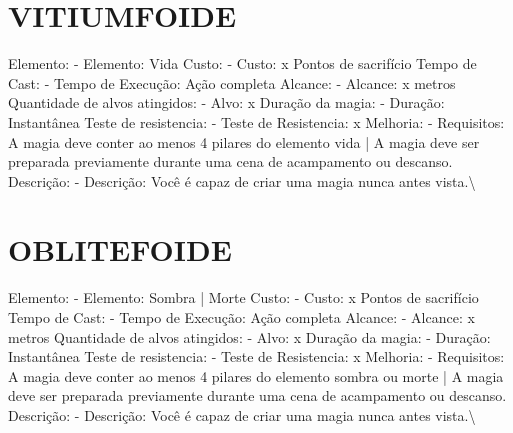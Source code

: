 \documentclass{article}%
\begin{document}
\section{VITIUMFOIDE}%
\label{sec:VITIUMFOIDE}%
Elemento: {-} Elemento: Vida\newline%
Custo: {-} Custo: x Pontos de sacrifício\newline%
Tempo de Cast: {-} Tempo de Execução: Ação completa\newline%
Alcance: {-} Alcance: x metros\newline%
Quantidade de alvos atingidos: {-} Alvo: x\newline%
Duração da magia: {-} Duração: Instantânea\newline%
Teste de resistencia: {-} Teste de Resistencia: x\newline%
Melhoria: {-} Requisitos: A magia deve conter ao menos 4 pilares do elemento vida | A magia deve ser preparada previamente durante uma cena de acampamento ou descanso.\newline%
Descrição: {-} Descrição: Você é capaz de criar uma magia nunca antes vista.\textbackslash{}

%
\section{OBLITEFOIDE}%
\label{sec:OBLITEFOIDE}%
Elemento: {-} Elemento: Sombra | Morte\newline%
Custo: {-} Custo: x Pontos de sacrifício\newline%
Tempo de Cast: {-} Tempo de Execução: Ação completa\newline%
Alcance: {-} Alcance: x metros\newline%
Quantidade de alvos atingidos: {-} Alvo: x\newline%
Duração da magia: {-} Duração: Instantânea\newline%
Teste de resistencia: {-} Teste de Resistencia: x\newline%
Melhoria: {-} Requisitos: A magia deve conter ao menos 4 pilares do elemento sombra ou morte | A magia deve ser preparada previamente durante uma cena de acampamento ou descanso.\newline%
Descrição: {-} Descrição: Você é capaz de criar uma magia nunca antes vista.\textbackslash{}

%
\end{document}
